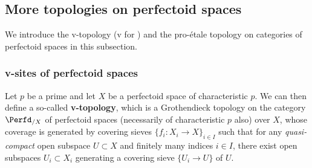 \subsection{More topologies on perfectoid spaces}
            We introduce the v-topology (v for ) and the pro-\'etale topology on categories of perfectoid spaces in this subsection.
        
            \subsubsection{v-sites of perfectoid spaces}
                \begin{definition} \label{def: v_topology} 
                    Let $p$ be a prime and let $X$ be a perfectoid space of characteristic $p$. We can then define a so-called \textbf{v-topology}, which is a Grothendieck topology on the category $\Perfd_{/X}$ of perfectoid spaces (necessarily of characteristic $p$ also) over $X$, whose coverage is generated by covering sieves $\{f_i: X_i \to X\}_{i \in I}$ such that for any \textit{quasi-compact} open subspace $U \subset X$ and finitely many indices $i \in I$, there exist open subspaces $U_i \subset X_i$ generating a covering sieve $\{U_i \to U\}$ of $U$. 
                \end{definition}
